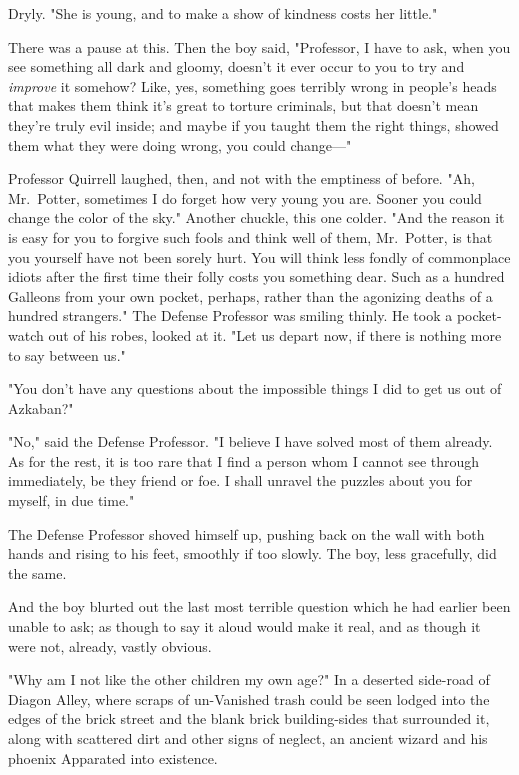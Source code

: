 Dryly. "She is young, and to make a show of kindness costs her little."

There was a pause at this. Then the boy said, "Professor, I have to ask, when 
you see something all dark and gloomy, doesn't it ever occur to you to try and 
\emph{improve} it somehow? Like, yes, something goes terribly wrong in people's 
heads that makes them think it's great to torture criminals, but that doesn't 
mean they're truly evil inside; and maybe if you taught them the right things, 
showed them what they were doing wrong, you could change---"

Professor Quirrell laughed, then, and not with the emptiness of before. "Ah, 
Mr.~Potter, sometimes I do forget how very young you are. Sooner you could 
change the color of the sky." Another chuckle, this one colder. "And the reason 
it is easy for you to forgive such fools and think well of them, Mr.~Potter, is 
that you yourself have not been sorely hurt. You will think less fondly of 
commonplace idiots after the first time their folly costs you something dear. 
Such as a hundred Galleons from your own pocket, perhaps, rather than the 
agonizing deaths of a hundred strangers." The Defense Professor was smiling 
thinly. He took a pocket-watch out of his robes, looked at it. "Let us depart 
now, if there is nothing more to say between us."

"You don't have any questions about the impossible things I did to get us out 
of Azkaban?"

"No," said the Defense Professor. "I believe I have solved most of them 
already. As for the rest, it is too rare that I find a person whom I cannot see 
through immediately, be they friend or foe. I shall unravel the puzzles about 
you for myself, in due time."

The Defense Professor shoved himself up, pushing back on the wall with both 
hands and rising to his feet, smoothly if too slowly. The boy, less gracefully, 
did the same.

And the boy blurted out the last most terrible question which he had earlier 
been unable to ask; as though to say it aloud would make it real, and as though 
it were not, already, vastly obvious.

"Why am I not like the other children my own age?"
\sbreak
In a deserted side-road of Diagon Alley, where scraps of un-Vanished trash 
could be seen lodged into the edges of the brick street and the blank brick 
building-sides that surrounded it, along with scattered dirt and other signs of 
neglect, an ancient wizard and his phoenix Apparated into existence.

